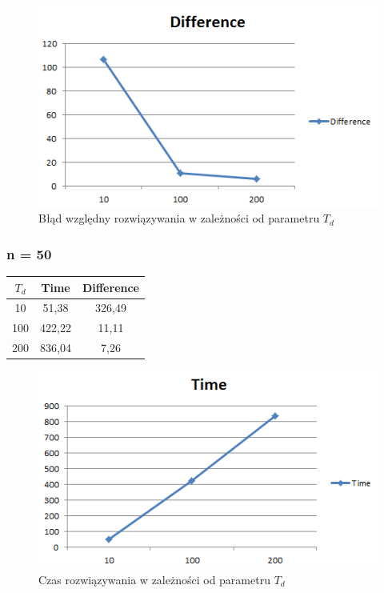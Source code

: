 \documentclass[wide,a4paper,titlepage,12pt] {article}
\begin{document}
\begin{figure}[htbp]
  \begin{center}
         \includegraphics[scale=0.8]{charts/diff40.PNG}
         \caption{Błąd względny rozwiązywania w zależności od parametru $T_d$}
  \end{center}
\end{figure}

\newpage
\subsubsection{n = 50}
\begin{center}
    \begin{tabular}{|c|c|c|}
      \hline
       $T_{d}$ & Time & Difference \\ \hline
       10 & 51,38 &  326,49 \\ \hline
            100 &422,22 & 11,11\\ \hline
            200& 836,04  &7,26\\ \hline
  \end{tabular}
\end{center}



\begin{figure}[htbp]
  \begin{center}
         \includegraphics[scale=0.8]{charts/time50.PNG}
         \caption{Czas rozwiązywania w zależności od parametru $T_d$}
  \end{center}
\end{figure}
\end{document}
